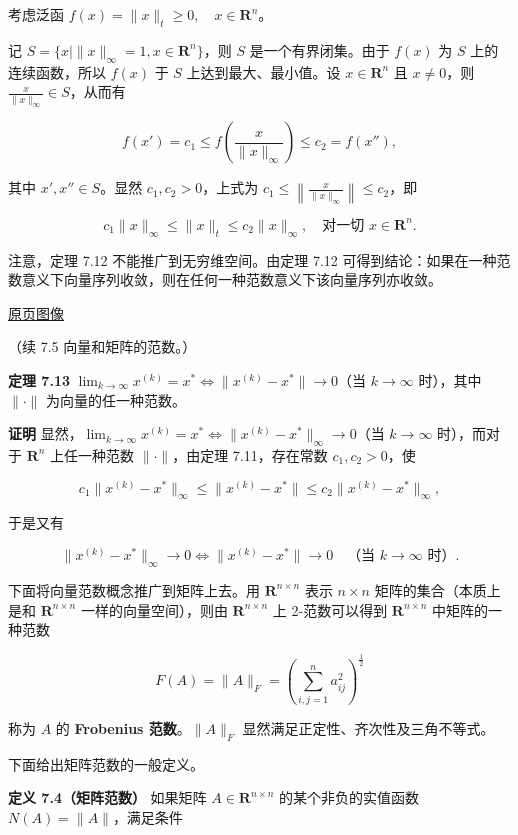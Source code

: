 \documentclass[
  10pt,
  fontset=fandol]{ctexart}
\begin{document}
考虑泛函 \(f(x)=\|x\|_t\geqslant0,\quad x\in\mathbf R^n\)。

记 \(S=\{x\mid\|x\|_\infty=1,x\in\mathbf R^n\}\)，则 \(S\) 是一个有界闭集。由于 \(f(x)\) 为 \(S\) 上的连续函数，所以 \(f(x)\) 于 \(S\) 上达到最大、最小值。设 \(x\in\mathbf R^n\) 且 \(x\neq0\)，则 \(\frac{x}{\|x\|_\infty}\in S\)，从而有

\[
f(x')=c_1\leqslant f\left(\frac{x}{\|x\|_\infty}\right)\leqslant c_2=f(x''),
\tag{7.5.3}
\]

其中 \(x',x''\in S\)。显然 \(c_1,c_2>0\)，上式为 \(c_1\leqslant\left\|\frac{x}{\|x\|_\infty}\right\|\leqslant c_2\)，即

\[
c_1\|x\|_\infty\leqslant\|x\|_t\leqslant c_2\|x\|_\infty,\quad\text{对一切 }x\in\mathbf R^n.
\]

注意，定理 7.12 不能推广到无穷维空间。由定理 7.12 可得到结论：如果在一种范数意义下向量序列收敛，则在任何一种范数意义下该向量序列亦收敛。

\href{../../source-images/pdf-202.jpeg}{原页图像}

（续 7.5 向量和矩阵的范数。）

\textbf{定理 7.13} \(\lim_{k\to\infty}x^{(k)}=x^*\Longleftrightarrow\|x^{(k)}-x^*\|\to0\)（当 \(k\to\infty\) 时），其中 \(\|\cdot\|\) 为向量的任一种范数。

\textbf{证明} 显然，\(\lim_{k\to\infty}x^{(k)}=x^*\Longleftrightarrow\|x^{(k)}-x^*\|_\infty\to0\)（当 \(k\to\infty\) 时），而对于 \(\mathbf R^n\) 上任一种范数 \(\|\cdot\|\)，由定理 7.11，存在常数 \(c_1,c_2>0\)，使

\[
c_1\|x^{(k)}-x^*\|_\infty\leqslant\|x^{(k)}-x^*\|\leqslant c_2\|x^{(k)}-x^*\|_\infty,
\]

于是又有

\[
\|x^{(k)}-x^*\|_\infty\to0\Longleftrightarrow\|x^{(k)}-x^*\|\to0\quad\text{（当 }k\to\infty\text{ 时）}.
\]

下面将向量范数概念推广到矩阵上去。用 \(\mathbf R^{n\times n}\) 表示 \(n\times n\) 矩阵的集合（本质上是和 \(\mathbf R^{n\times n}\) 一样的向量空间），则由 \(\mathbf R^{n\times n}\) 上 2-范数可以得到 \(\mathbf R^{n\times n}\) 中矩阵的一种范数

\[
F(A)=\|A\|_F=\left(\sum_{i,j=1}^{n}a_{ij}^{2}\right)^{\frac12}
\]

称为 \(A\) 的 \textbf{Frobenius 范数}。\(\|A\|_F\) 显然满足正定性、齐次性及三角不等式。

下面给出矩阵范数的一般定义。

\textbf{定义 7.4（矩阵范数）} 如果矩阵 \(A\in\mathbf R^{n\times n}\) 的某个非负的实值函数 \(N(A)=\|A\|\)，满足条件
\end{document}
